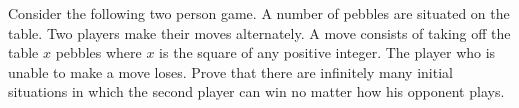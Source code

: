 Consider the following two person game. A number of pebbles are situated on the table. Two players make their moves alternately. A move consists of taking off the table $x$ pebbles where $x$ is the square of any positive integer. The player who is unable to make a move loses. Prove that there are infinitely many initial situations in which the second player can win no matter how his opponent plays.